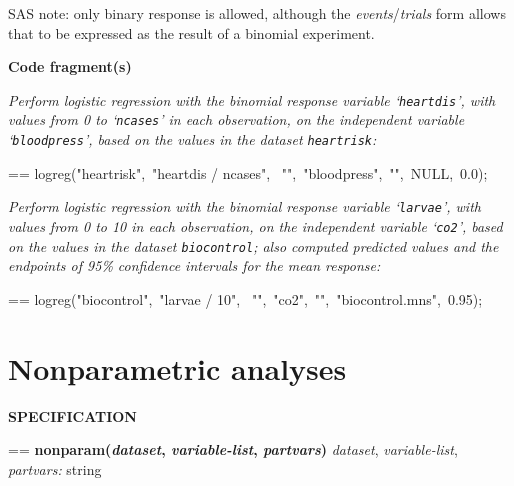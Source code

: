 \documentclass{book}
\makeatletter
\newcommand\Texinfocommandstyletextvar[1]{{\normalfont{}\textsl{#1}}}%
\newenvironment{Texinfopreformatted}{%
  \par\GNUTobeylines\obeyspaces\frenchspacing\parskip=\z@\parindent=\z@}{}
{\catcode`\^^M=13 \gdef\GNUTobeylines{\catcode`\^^M=13 \def^^M{\null\par}}}
\newenvironment{Texinfoindented}{\begin{list}{}{}\item\relax}{\end{list}}
\renewcommand{\_}{\Texinfounderscore\discretionary{}{}{}}
\makeatother
\begin{document}
SAS note: only binary response is allowed, although the
\Texinfocommandstyletextvar{events}/\Texinfocommandstyletextvar{trials} form
allows that to be expressed as the result of a binomial experiment.

\noindent{}\textbf{Code fragment(s)}

\emph{Perform logistic regression with the binomial response variable
`\texttt{heartdis}', with values from 0 to `\texttt{ncases}' in each observation,
on the independent variable `\texttt{bloodpress}', based on the values in
the dataset \texttt{heartrisk}:}
\begin{Texinfoindented}
\begin{Texinfopreformatted}%
\ttfamily logreg("heartrisk",\ "heartdis / ncases",
\                 "",\ "bloodpress",\ "",\ NULL,\ 0.0);
\end{Texinfopreformatted}
\end{Texinfoindented}

\emph{Perform logistic regression with the binomial response variable
`\texttt{larvae}', with values from 0 to 10 in each observation,
on the independent variable `\texttt{co2}', based on the values in
the dataset \texttt{biocontrol}; also computed predicted values and
the endpoints of 95\% confidence intervals for the mean response:}
\begin{Texinfoindented}
\begin{Texinfopreformatted}%
\ttfamily logreg("biocontrol",\ "larvae / 10",
\                 "",\ "co2",\ "",\ "biocontrol.mns",\ 0.95);
\end{Texinfopreformatted}
\end{Texinfoindented}

\section{{Nonparametric analyses}}
\label{anchor:Nonparametric-analyses}%

\noindent{}\textbf{SPECIFICATION}
\begin{Texinfoindented}
\begin{Texinfopreformatted}%
\textbf{nonparam(\Texinfocommandstyletextvar{dataset}, \Texinfocommandstyletextvar{variable-list}, \Texinfocommandstyletextvar{partvars})}
\Texinfocommandstyletextvar{dataset}, \Texinfocommandstyletextvar{variable-list}, \Texinfocommandstyletextvar{partvars:} string
\end{Texinfopreformatted}
\end{Texinfoindented}
\end{document}
